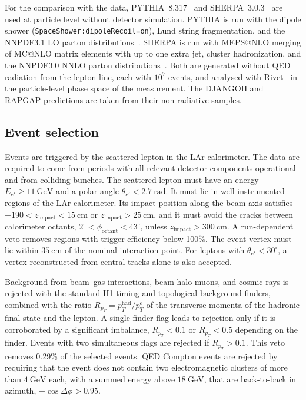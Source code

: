 \documentclass[11pt,a4paper]{article}
\newcommand{\GeV}{\mathrm{GeV}}
\begin{document}
For the comparison with the data, PYTHIA~8.317~\cite{Bierlich:2022pfr} and SHERPA~3.0.3~\cite{Sherpa:2024mfk} are used at particle level without detector simulation. PYTHIA is run with the dipole shower (\texttt{SpaceShower:\allowbreak dipoleRecoil=on}), Lund string fragmentation, and the NNPDF3.1 LO parton distributions~\cite{Ball:2017nwa}. SHERPA is run with MEPS@NLO merging of MC@NLO matrix elements with up to one extra jet, cluster hadronization, and the NNPDF3.0 NNLO parton distributions~\cite{NNPDF:2014otw}. Both are generated without QED radiation from the lepton line, each with $10^{7}$ events, and analysed with Rivet~\cite{Bierlich:2019rhm} in the particle-level phase space of the measurement. The DJANGOH and RAPGAP predictions are taken from their non-radiative samples.

\subsection{Event selection}

Events are triggered by the scattered lepton in the LAr calorimeter. The data are required to come from periods with all relevant detector components operational and from colliding bunches. The scattered lepton must have an energy $E_{e'}\geq11~\GeV$ and a polar angle $\theta_{e'}<2.7~\mathrm{rad}$. It must lie in well-instrumented regions of the LAr calorimeter. Its impact position along the beam axis satisfies $-190<z_{\mathrm{impact}}<15~\mathrm{cm}$ or $z_{\mathrm{impact}}>25~\mathrm{cm}$, and it must avoid the cracks between calorimeter octants, $2^{\circ}<\phi_{\mathrm{octant}}<43^{\circ}$, unless $z_{\mathrm{impact}}>300~\mathrm{cm}$. A run-dependent veto removes regions with trigger efficiency below 100\%. The event vertex must lie within $35~\mathrm{cm}$ of the nominal interaction point. For leptons with $\theta_{e'}<30^{\circ}$, a vertex reconstructed from central tracks alone is also accepted.

Background from beam--gas interactions, beam-halo muons, and cosmic rays is rejected with the standard H1 timing and topological background finders, combined with the ratio $R_{p_{T}}=p_{T}^{\mathrm{had}}/p_{T}^{e}$ of the transverse momenta of the hadronic final state and the lepton. A single finder flag leads to rejection only if it is corroborated by a significant imbalance, $R_{p_{T}}<0.1$ or $R_{p_{T}}<0.5$ depending on the finder. Events with two simultaneous flags are rejected if $R_{p_{T}}>0.1$. This veto removes 0.29\% of the selected events. QED Compton events are rejected by requiring that the event does not contain two electromagnetic clusters of more than $4~\GeV$ each, with a summed energy above $18~\GeV$, that are back-to-back in azimuth, $-\cos\Delta\phi>0.95$.
\end{document}
